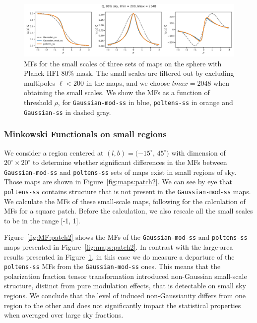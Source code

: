 \documentclass[twocolumn]{aastex631}
\begin{document}
\begin{figure}[hbt!]
    \centering
    \includegraphics[width=180mm]{figures/MFs_80p_sky_Q.pdf}
    \caption{MFs for the small scales of three sets of maps on the sphere with Planck HFI 80\% mask. The small scales are filtered out by excluding multipoles $\ell < 200$ in the maps, and we choose $lmax = 2048$ when obtaining the small scales. We show the MFs as a function of threshold $\rho$, for \texttt{Gaussian-mod-ss} in blue, \texttt{poltens-ss} in orange and \texttt{Gaussian-ss} in dashed gray.}
    \label{fig:MF:sphere}
\end{figure}

\subsubsection{Minkowski Functionals on small regions}
We consider a region centered at $(l, b) = (-15^{\circ}$, $45^{\circ})$ with dimension of $20^{\circ}\times20^{\circ}$ to determine whether significant differences in the MFs between \texttt{Gaussian-mod-ss} and \texttt{poltens-ss} sets of maps exist in small regions of sky. Those maps are shown in Figure~\ref{fig:maps:patch2}. We can see by eye that \texttt{poltens-ss} contains structure that is not present in the \texttt{Gaussian-mod-ss} maps. We calculate the MFs of these small-scale maps, following \cite{Mantz:2008} for the calculation of MFs for a square patch. Before the calculation, we also rescale all the small scales to be in the range [-1, 1].

Figure~\ref{fig:MF:patch2} shows the MFs of the \texttt{Gaussian-mod-ss} and \texttt{poltens-ss} maps presented in Figure~\ref{fig:maps:patch2}. In contrast with the large-area results presented in Figure~\ref{fig:MF:sphere}, in this case we do measure a departure of the \texttt{poltens-ss} MFs from the \texttt{Gaussian-mod-ss} ones. %
This means that the polarization fraction tensor transformation introduced non-Gaussian small-scale structure, distinct from pure modulation effects, that is detectable on small sky regions. 
We conclude that the level of induced non-Gaussianity differs from one region to the other and does not significantly impact the statistical properties when averaged over large sky fractions.
\end{document}
